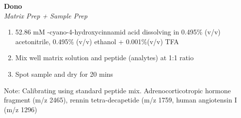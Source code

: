 \textbf{Dono} 
\\
\textit{Matrix Prep + Sample Prep}
\begin{enumerate}
\item{52.86 mM \alpha-cyano-4-hydroxycinnamid acid dissolving in 0.495\% (v/v) acetonitrile, 0.495\% (v/v) ethanol + 0.001\%(v/v) TFA}
\item{Mix well matrix solution and peptide (analytes) at 1:1 ratio}
\item{Spot sample and dry for 20 mins}
\end{enumerate}
\footnotesize
Note: Calibrating using standard peptide mix. Adrenocorticotropic hormone fragment (m/z 2465), rennin tetra-decapetide (m/z 1759, human angiotensin I (m/z 1296)